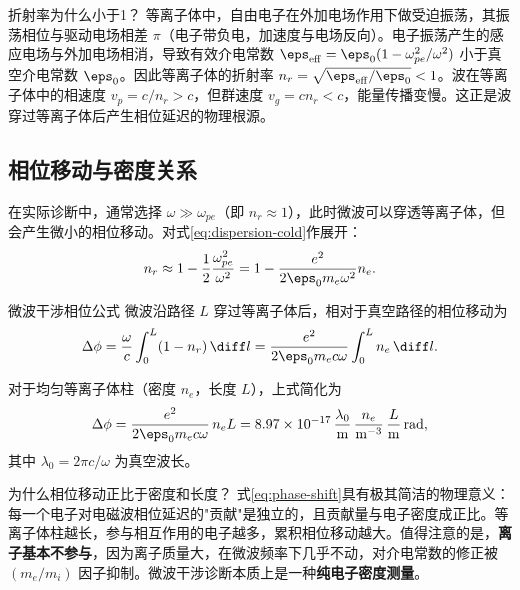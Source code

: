 \begin{insight}{折射率为什么小于1？}{}{}
等离子体中，自由电子在外加电场作用下做受迫振荡，其振荡相位与驱动电场相差 $\pi$（电子带负电，加速度与电场反向）。电子振荡产生的感应电场与外加电场相消，导致有效介电常数 $\eps_{\mathrm{eff}} = \eps_0(1 - \omega_{pe}^2/\omega^2)$ 小于真空介电常数 $\eps_0$。因此等离子体的折射率 $n_r = \sqrt{\eps_{\mathrm{eff}}/\eps_0} < 1$。波在等离子体中的相速度 $v_p = c/n_r > c$，但群速度 $v_g = c n_r < c$，能量传播变慢。这正是波穿过等离子体后产生相位延迟的物理根源。
\end{insight}

\subsection{相位移动与密度关系}

在实际诊断中，通常选择 $\omega \gg \omega_{pe}$（即 $n_r \approx 1$），此时微波可以穿透等离子体，但会产生微小的相位移动。对式\eqref{eq:dispersion-cold}作展开：
\begin{equation}
n_r \approx 1 - \frac{1}{2}\frac{\omega_{pe}^2}{\omega^2}
= 1 - \frac{e^2}{2\eps_0 m_e \omega^2} n_e.
\end{equation}

\begin{theorem}{微波干涉相位公式}{}{}
微波沿路径 $L$ 穿过等离子体后，相对于真空路径的相位移动为
\begin{equation}
\Delta\phi = \frac{\omega}{c}\int_0^L (1 - n_r)\,\diff l
= \frac{e^2}{2\eps_0 m_e c \omega} \int_0^L n_e\,\diff l.
\label{eq:phase-shift}
\end{equation}

对于均匀等离子体柱（密度 $n_e$，长度 $L$），上式简化为
\begin{equation}
\Delta\phi = \frac{e^2}{2\eps_0 m_e c \omega}\, n_e L
= 8.97\times 10^{-17}\,\frac{\lambda_0}{\mathrm{m}} \,\frac{n_e}{\mathrm{m}^{-3}}\,\frac{L}{\mathrm{m}}\,\mathrm{rad},
\label{eq:phase-shift-uniform}
\end{equation}
其中 $\lambda_0 = 2\pi c/\omega$ 为真空波长。
\end{theorem}

\begin{insight}{为什么相位移动正比于密度和长度？}{}{}
式\eqref{eq:phase-shift}具有极其简洁的物理意义：每一个电子对电磁波相位延迟的"贡献"是独立的，且贡献量与电子密度成正比。等离子体柱越长，参与相互作用的电子越多，累积相位移动越大。值得注意的是，\textbf{离子基本不参与}，因为离子质量大，在微波频率下几乎不动，对介电常数的修正被 $(m_e/m_i)$ 因子抑制。微波干涉诊断本质上是一种\textbf{纯电子密度测量}。
\end{insight}

